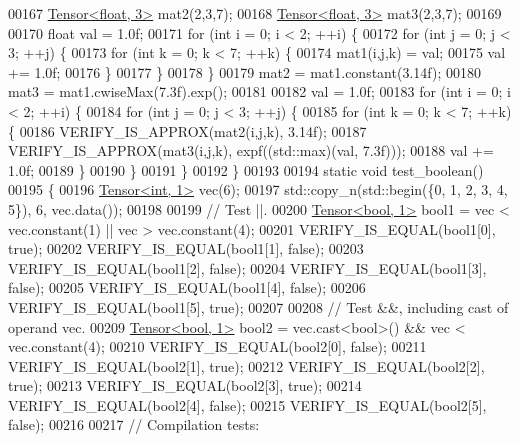 \begin{DoxyCode}
00167   \hyperlink{class_eigen_1_1_tensor}{Tensor<float, 3>} mat2(2,3,7);
00168   \hyperlink{class_eigen_1_1_tensor}{Tensor<float, 3>} mat3(2,3,7);
00169 
00170   \textcolor{keywordtype}{float} val = 1.0f;
00171   \textcolor{keywordflow}{for} (\textcolor{keywordtype}{int} i = 0; i < 2; ++i) \{
00172     \textcolor{keywordflow}{for} (\textcolor{keywordtype}{int} j = 0; j < 3; ++j) \{
00173       \textcolor{keywordflow}{for} (\textcolor{keywordtype}{int} k = 0; k < 7; ++k) \{
00174         mat1(i,j,k) = val;
00175         val += 1.0f;
00176       \}
00177     \}
00178   \}
00179   mat2 = mat1.constant(3.14f);
00180   mat3 = mat1.cwiseMax(7.3f).exp();
00181 
00182   val = 1.0f;
00183   \textcolor{keywordflow}{for} (\textcolor{keywordtype}{int} i = 0; i < 2; ++i) \{
00184     \textcolor{keywordflow}{for} (\textcolor{keywordtype}{int} j = 0; j < 3; ++j) \{
00185       \textcolor{keywordflow}{for} (\textcolor{keywordtype}{int} k = 0; k < 7; ++k) \{
00186         VERIFY\_IS\_APPROX(mat2(i,j,k), 3.14f);
00187         VERIFY\_IS\_APPROX(mat3(i,j,k), expf((std::max)(val, 7.3f)));
00188         val += 1.0f;
00189       \}
00190     \}
00191   \}
00192 \}
00193 
00194 \textcolor{keyword}{static} \textcolor{keywordtype}{void} test\_boolean()
00195 \{
00196   \hyperlink{class_eigen_1_1_tensor}{Tensor<int, 1>} vec(6);
00197   std::copy\_n(std::begin(\{0, 1, 2, 3, 4, 5\}), 6, vec.data());
00198 
00199   \textcolor{comment}{// Test ||.}
00200   \hyperlink{class_eigen_1_1_tensor}{Tensor<bool, 1>} bool1 = vec < vec.constant(1) || vec > vec.constant(4);
00201   VERIFY\_IS\_EQUAL(bool1[0], \textcolor{keyword}{true});
00202   VERIFY\_IS\_EQUAL(bool1[1], \textcolor{keyword}{false});
00203   VERIFY\_IS\_EQUAL(bool1[2], \textcolor{keyword}{false});
00204   VERIFY\_IS\_EQUAL(bool1[3], \textcolor{keyword}{false});
00205   VERIFY\_IS\_EQUAL(bool1[4], \textcolor{keyword}{false});
00206   VERIFY\_IS\_EQUAL(bool1[5], \textcolor{keyword}{true});
00207 
00208   \textcolor{comment}{// Test &&, including cast of operand vec.}
00209   \hyperlink{class_eigen_1_1_tensor}{Tensor<bool, 1>} bool2 = vec.cast<\textcolor{keywordtype}{bool}>() && vec < vec.constant(4);
00210   VERIFY\_IS\_EQUAL(bool2[0], \textcolor{keyword}{false});
00211   VERIFY\_IS\_EQUAL(bool2[1], \textcolor{keyword}{true});
00212   VERIFY\_IS\_EQUAL(bool2[2], \textcolor{keyword}{true});
00213   VERIFY\_IS\_EQUAL(bool2[3], \textcolor{keyword}{true});
00214   VERIFY\_IS\_EQUAL(bool2[4], \textcolor{keyword}{false});
00215   VERIFY\_IS\_EQUAL(bool2[5], \textcolor{keyword}{false});
00216 
00217   \textcolor{comment}{// Compilation tests:}

\end{DoxyCode}
